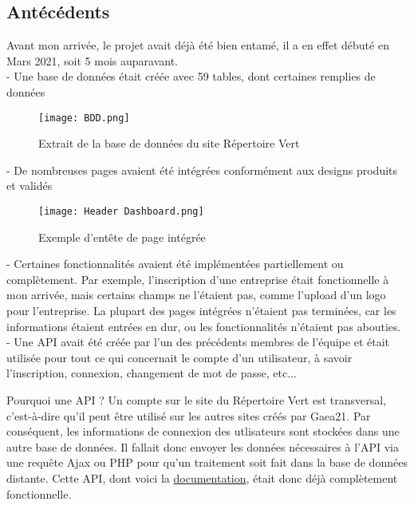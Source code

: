 \pagebreak
\subsection{Antécédents}
Avant mon arrivée, le projet avait déjà été bien entamé, il a en effet débuté en Mars 2021, soit 5 mois auparavant. \\
- Une base de données était créée avec 59 tables, dont certaines remplies de données \\

\begin{figure}[H]
    \centering
    \texttt{[image: BDD.png]}
    \caption{Extrait de la base de données du site Répertoire Vert}
\end{figure}

- De nombreuses pages avaient été intégrées conformément aux designs produits et validés \\

\begin{figure}[H]
    \centering
    \texttt{[image: Header Dashboard.png]}
    \caption{Exemple d'entête de page intégrée}
\end{figure}

- Certaines fonctionnalités avaient été implémentées partiellement ou complètement. Par exemple, l'inscription d'une entreprise était fonctionnelle à mon arrivée, mais certains champs ne l'étaient pas, comme l'upload d'un logo pour l'entreprise.
La plupart des pages intégrées n'étaient pas terminées, car les informations étaient entrées en dur, ou les fonctionnalités n'étaient pas abouties. \\

- Une API avait été créée par l'un des précédents membres de l'équipe et était utilisée pour tout ce qui concernait le compte d'un utilisateur, à savoir l'inscription, connexion, changement de mot de passe, etc... \\

\begin{callout}{Pourquoi une API ?}
Un compte sur le site du Répertoire Vert est transversal, c'est-à-dire qu'il peut être utilisé sur les autres sites créés par Gaea21. 
Par conséquent, les informations de connexion des utlisateurs sont stockées dans une autre base de données. 
Il fallait donc envoyer les données nécessaires à l'API via une requête Ajax ou PHP pour qu'un traitement soit fait dans la base de données distante. 
Cette API, dont voici la \href{https://gaea21user.sustlivprogram.org/swagger/#/}{documentation}, était donc déjà complètement fonctionnelle.
\end{callout}

